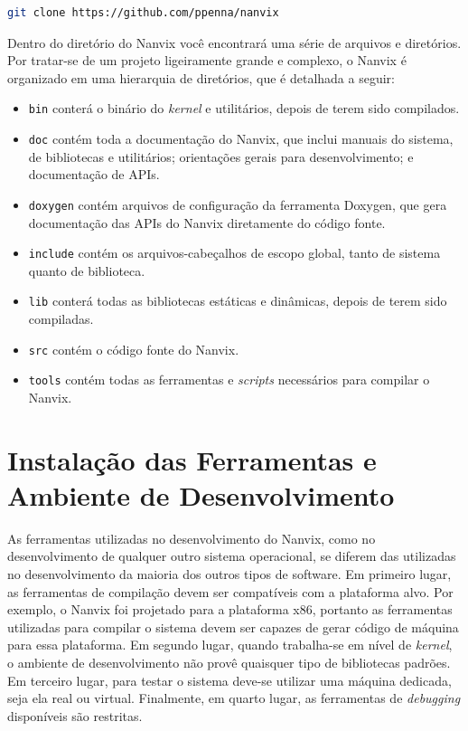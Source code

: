 \documentclass[11pt]{article}
\begin{document}
\begin{lstlisting}[language=bash,numbers=none,frame=single]
git clone https://github.com/ppenna/nanvix
\end{lstlisting}

Dentro do diretório do Nanvix você encontrará uma série de arquivos e diretórios. Por tratar-se de um projeto ligeiramente grande e complexo, o Nanvix é organizado em uma hierarquia de diretórios, que é detalhada a seguir:

\begin{itemize}
    \item \texttt{bin} conterá o binário do \textit{kernel} e utilitários, depois de terem sido compilados.
    \item \texttt{doc} contém toda a documentação do Nanvix, que inclui manuais do sistema, de bibliotecas e utilitários; orientações gerais para desenvolvimento; e documentação de APIs.
    \item \texttt{doxygen} contém arquivos de configuração da ferramenta Doxygen, que gera documentação das APIs do Nanvix diretamente do código fonte.
    \item \texttt{include} contém os arquivos-cabeçalhos de escopo global, tanto de sistema quanto de biblioteca.
    \item \texttt{lib} conterá todas as bibliotecas estáticas e dinâmicas, depois de terem sido compiladas.
    \item \texttt{src} contém o código fonte do Nanvix.
    \item \texttt{tools} contém todas as ferramentas e \textit{scripts} necessários para compilar o Nanvix.
\end{itemize}

\section{Instalação das Ferramentas e Ambiente de Desenvolvimento}
\label{sec:ferramentas}

As ferramentas utilizadas no desenvolvimento do Nanvix, como no desenvolvimento de qualquer outro sistema operacional, se diferem das utilizadas no desenvolvimento da maioria dos outros tipos de software. Em primeiro lugar, as ferramentas de compilação devem ser compatíveis com a plataforma alvo. Por exemplo, o Nanvix foi projetado para a plataforma x86, portanto as ferramentas utilizadas para compilar o sistema devem ser capazes de gerar código de máquina para essa plataforma. Em segundo lugar, quando trabalha-se em nível de \textit{kernel}, o ambiente de desenvolvimento não provê quaisquer tipo de bibliotecas padrões. Em terceiro lugar, para testar o sistema deve-se utilizar uma máquina dedicada, seja ela real ou virtual. Finalmente, em quarto lugar, as ferramentas de \textit{debugging} disponíveis são restritas.
\end{document}
